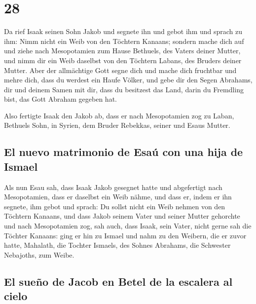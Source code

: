 \hypertarget{section-27}{%
\section{28}\label{section-27}}

 Da rief Isaak seinen Sohn Jakob und segnete ihn und gebot
ihm und sprach zu ihm: Nimm nicht ein Weib von den Töchtern Kanaans;
 sondern mache dich auf und ziehe nach Mesopotamien zum
Hause Bethuels, des Vaters deiner Mutter, und nimm dir ein Weib daselbst
von den Töchtern Labans, des Bruders deiner Mutter.  Aber
der allmächtige Gott segne dich und mache dich fruchtbar und mehre dich,
dass du werdest ein Haufe Völker,  und gebe dir den Segen
Abrahams, dir und deinem Samen mit dir, dass du besitzest das Land,
darin du Fremdling bist, das Gott Abraham gegeben hat.

 Also fertigte Isaak den Jakob ab, dass er nach
Mesopotamien zog zu Laban, Bethuels Sohn, in Syrien, dem Bruder
Rebekkas, seiner und Esaus Mutter.

\hypertarget{el-nuevo-matrimonio-de-esauxfa-con-una-hija-de-ismael}{%
\subsection{El nuevo matrimonio de Esaú con una hija de
Ismael}\label{el-nuevo-matrimonio-de-esauxfa-con-una-hija-de-ismael}}

 Als nun Esau sah, dass Isaak Jakob gesegnet hatte und
abgefertigt nach Mesopotamien, dass er daselbst ein Weib nähme, und dass
er, indem er ihn segnete, ihm gebot und sprach: Du sollst nicht ein Weib
nehmen von den Töchtern Kanaans,  und dass Jakob seinem
Vater und seiner Mutter gehorchte und nach Mesopotamien zog,
 sah auch, dass Isaak, sein Vater, nicht gerne sah die
Töchter Kanaans:  ging er hin zu Ismael und nahm zu den
Weibern, die er zuvor hatte, Mahalath, die Tochter Ismaels, des Sohnes
Abrahams, die Schwester Nebajoths, zum Weibe.

\hypertarget{el-sueuxf1o-de-jacob-en-betel-de-la-escalera-al-cielo}{%
\subsection{El sueño de Jacob en Betel de la escalera al
cielo}\label{el-sueuxf1o-de-jacob-en-betel-de-la-escalera-al-cielo}}

